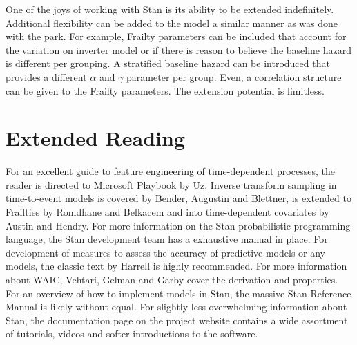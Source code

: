 One of the joys of working with Stan is its ability to be extended indefinitely. Additional flexibility can be added to the model a similar manner as was done with the park. For example, Frailty parameters can be included that account for the variation on inverter model or if there is reason to believe the baseline hazard is different per grouping. A stratified baseline hazard can be introduced that provides a different $\alpha$ and $\gamma$ parameter per group. Even, a correlation structure can be given to the Frailty parameters. The extension potential is limitless. 























\section*{Extended Reading}

For an excellent guide to feature engineering of time-dependent processes, the reader is directed to Microsoft Playbook by Uz\cite{Uz2016}. Inverse transform sampling in time-to-event models is covered by Bender, Augustin and Blettner\cite{Bender2005}, is extended to Frailties by Romdhane and Belkacem\cite{Romdhane2015} and into time-dependent covariates by Austin\cite{Austin2012} and Hendry\cite{Hendry2014}. For more information on the Stan probabilistic programming language, the Stan development team has a exhaustive manual in place\cite{StanDevelopmentTeam2016}. For development of measures to assess the accuracy of predictive models or any models, the classic text by Harrell is highly recommended\cite{Harrell2001}. For more information about WAIC, Vehtari, Gelman and Garby cover the derivation and properties\cite{Vehtari2015}. For an overview of how to implement models in Stan, the massive Stan Reference Manual is likely without equal\cite{StanDevelopmentTeam2016}. For slightly less overwhelming information about Stan, the documentation page on the project website contains a wide assortment of tutorials, videos and softer introductions to the software\cite{StanDevelopmentTeam2016a}.


